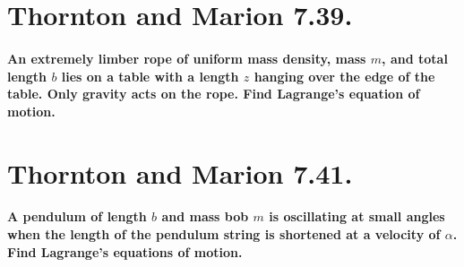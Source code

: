 \documentclass{article}
\numberwithin{equation}{section}
\begin{document}
\section{Thornton and Marion 7.39.}

\paragraph{An extremely limber rope of uniform mass density, mass $m$, and total length $b$ lies on a table with a length $z$ hanging over the edge of the table. Only gravity acts on the rope. Find Lagrange’s equation of motion.\\}

\section{Thornton and Marion 7.41.}

\paragraph{A pendulum of length $b$ and mass bob $m$ is oscillating at small angles when the length of the pendulum string is shortened at a velocity of $\alpha$. Find Lagrange’s equations of motion. \\}
\end{document}

